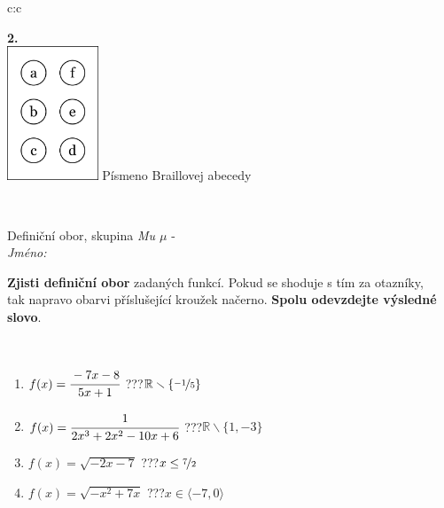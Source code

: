 \documentclass[10pt]{report}
\begin{document}
\begin{tabular}{c:c}
\begin{minipage}[c][104.5mm][t]{0.5\linewidth}
\begin{center}
\begin{minipage}{0.20\linewidth}
\begin{center}
{\Huge\bfseries 2.} \\[2mm]
\includegraphics[height=40mm]{../images/braille.png}
{\small Písmeno Braillovej abecedy}
\end{center}
\end{minipage}
\end{center}
\end{minipage}
\\ \hdashline
\begin{minipage}[c][104.5mm][t]{0.5\linewidth}
\begin{center}
\vspace{7mm}
{\huge Definiční obor, skupina \textit{Mu $\mu$} -}\\[5mm]
\textit{Jméno:}\phantom{xxxxxxxxxxxxxxxxxxxxxxxxxxxxxxxxxxxxxxxxxxxxxxxxxxxxxxxxxxxxxxxxx}\\[5mm]
\begin{minipage}{0.95\linewidth}
\begin{center}
\textbf{Zjisti definiční obor} zadaných funkcí. Pokud se shoduje s tím za otazníky,\\tak napravo obarvi příslušející kroužek načerno. \textbf{Spolu odevzdejte výsledné slovo}.
\end{center}
\end{minipage}
\\[1mm]
\begin{minipage}{0.79\linewidth}
\begin{center}
\begin{varwidth}{\linewidth}
\begin{enumerate}
\normalsizerrr
\item $f(x)=\cfrac{-7x-8}{5x+1}$\quad \dotfill\; ???\;\dotfill \quad $\mathbb{R}\smallsetminus\{\nicefrac{-1}{5}\}$
\item $f(x)=\cfrac{1}{2x^3+2x^2-10x+6}$\quad \dotfill\; ???\;\dotfill \quad $\mathbb{R}\smallsetminus\{1,-3\}$
\item $f(x)=\sqrt{-2x-7}$\quad \dotfill\; ???\;\dotfill \quad $x\leq\nicefrac{7}{2}$
\item $f(x)=\sqrt{-x^2+7x}$\quad \dotfill\; ???\;\dotfill \quad $x\in\langle-7 , 0\rangle$

\end{enumerate}
\end{varwidth}
\end{center}
\end{minipage}
\end{center}
\end{minipage}
\end{tabular}
\end{document}
